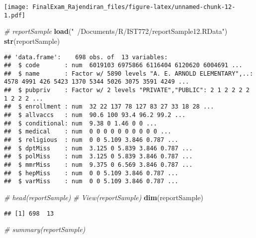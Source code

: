 \documentclass[]{article}
\newenvironment{Shaded}{\begin{snugshade}}{\end{snugshade}}
\newcommand{\CommentTok}[1]{\textcolor[rgb]{0.56,0.35,0.01}{\textit{#1}}}
\newcommand{\KeywordTok}[1]{\textcolor[rgb]{0.13,0.29,0.53}{\textbf{#1}}}
\newcommand{\NormalTok}[1]{#1}
\newcommand{\StringTok}[1]{\textcolor[rgb]{0.31,0.60,0.02}{#1}}
\begin{document}
\texttt{[image: FinalExam\_Rajendiran\_files/figure-latex/unnamed-chunk-12-1.pdf]}

\begin{Shaded}
\begin{Highlighting}[]
\CommentTok{# reportSample}
\KeywordTok{load}\NormalTok{(}\StringTok{"~/Documents/R/IST772/reportSample12.RData"}\NormalTok{)}
\KeywordTok{str}\NormalTok{(reportSample)}
\end{Highlighting}
\end{Shaded}

\begin{verbatim}
## 'data.frame':    698 obs. of  13 variables:
##  $ code       : num  6019103 6975866 6116404 6120620 6004691 ...
##  $ name       : Factor w/ 5890 levels "A. E. ARNOLD ELEMENTARY",..: 4578 4991 426 5423 1370 5344 5026 3075 3591 4249 ...
##  $ pubpriv    : Factor w/ 2 levels "PRIVATE","PUBLIC": 2 1 2 2 2 2 1 2 2 2 ...
##  $ enrollment : num  32 22 137 78 127 83 27 33 18 28 ...
##  $ allvaccs   : num  90.6 100 93.4 96.2 99.2 ...
##  $ conditional: num  9.38 0 1.46 0 0 ...
##  $ medical    : num  0 0 0 0 0 0 0 0 0 0 ...
##  $ religious  : num  0 0 5.109 3.846 0.787 ...
##  $ dptMiss    : num  3.125 0 5.839 3.846 0.787 ...
##  $ polMiss    : num  3.125 0 5.839 3.846 0.787 ...
##  $ mmrMiss    : num  9.375 0 6.569 3.846 0.787 ...
##  $ hepMiss    : num  0 0 5.109 3.846 0.787 ...
##  $ varMiss    : num  0 0 5.109 3.846 0.787 ...
\end{verbatim}

\begin{Shaded}
\begin{Highlighting}[]
\CommentTok{# head(reportSample)}
\CommentTok{# View(reportSample)}
\KeywordTok{dim}\NormalTok{(reportSample)}
\end{Highlighting}
\end{Shaded}

\begin{verbatim}
## [1] 698  13
\end{verbatim}

\begin{Shaded}
\begin{Highlighting}[]
\CommentTok{# summary(reportSample)}
\end{Highlighting}
\end{Shaded}
\end{document}
